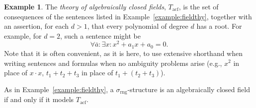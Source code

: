 \documentclass{article}
\theoremstyle{plain}
\theoremstyle{definition}
\newtheorem{example}[thm]{Example}
\newcommand{\defterm}{\emph}
\newcommand{\ringsig}{\sigma_{\operatorname{rng}}}
\newcommand{\acf}{T_{\operatorname{acf}}}
\newcommand{\tuple}{\bar}
\begin{document}
\begin{example}
  The \defterm{theory of algebraically closed fields}, $\acf$, is the
  set of consequences of the sentences listed in
  Example~\ref{example:fieldthy}, together with an assertion, for each
  $d > 1$, that every polynomial of degree $d$ has a root. For
  example, for $d = 2$, such a sentence might be $$\forall \tuple{a}:
  \exists x: x^2 + a_1x + a_0 = 0 \text{.}$$ Note that it is often
  convenient, as it is here, to use extensive shorthand when writing
  sentences and formulas when no ambiguity problems arise (e.g., $x^2$
  in place of $x \cdot x$, $t_1 + t_2 + t_3$ in place of $t_1 + (t_2 +
  t_3)$).

  As in Example~\ref{example:fieldthy}, a $\ringsig$-structure is an
  algebraically closed field if and only if it models $\acf$.
\end{example}
\end{document}
